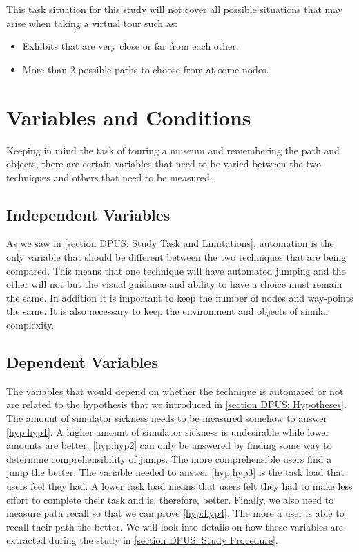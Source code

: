 This task situation for this study will not cover all possible situations that may arise when taking a virtual tour such as:
\begin{itemize}
	\item Exhibits that are very close or far from each other.
	\item More than 2 possible paths to choose from at some nodes.
\end{itemize} 

\section{Variables and Conditions}
\label{section DPUS: Variables and Conditions}
Keeping in mind the task of touring a museum and remembering the path and objects, there are certain variables that need to be varied between the two techniques and others that need to be measured. 

\subsection{Independent Variables}
\label{subsection DPUS VC: Independent Variables}
As we saw in \cref{section DPUS: Study Task and Limitations}, automation is the only variable that should be different between the two techniques that are being compared. This means that one technique will have automated jumping and the other will not but the visual guidance and ability to have a choice must remain the same. In addition it is important to keep the number of nodes and way-points the same. It is also necessary to keep the environment and objects of similar complexity. 

\subsection{Dependent Variables}
\label{subsection DPUS VC: Dependent Variables}
The variables that would depend on whether the technique is automated or not are related to the hypothesis that we introduced in \cref{section DPUS: Hypotheses}. The amount of simulator sickness needs to be measured somehow to answer \cref{hyp:hyp1}. A higher amount of simulator sickness is undesirable while lower amounts are better. \cref{hyp:hyp2} can only be answered by finding some way to determine comprehensibility of jumps. The more comprehensible users find a jump the better. The variable needed to answer \cref{hyp:hyp3} is the task load that users feel they had. A lower task load means that users felt they had to make less effort to complete their task and is, therefore, better. Finally, we also need to measure path recall so that we can prove \cref{hyp:hyp4}. The more a user is able to recall their path the better. We will look into details on how these variables are extracted during the study in \cref{section DPUS: Study Procedure}.

